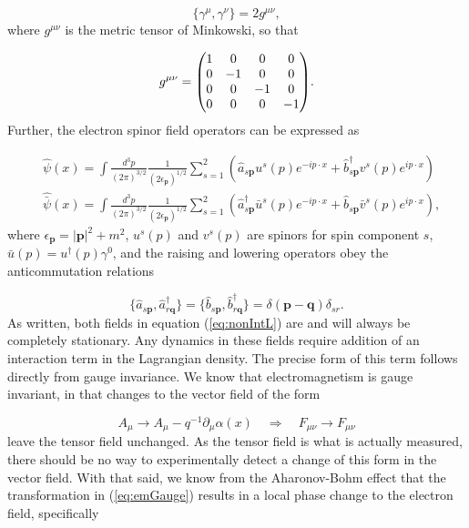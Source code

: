 \documentclass{article}
\begin{document}
\begin{equation}
    \{\gamma^\mu, \gamma^\nu\} = 2g^{\mu\nu},
\end{equation}
%
where $g^{\mu\nu}$ is the metric tensor of Minkowski, so that

\begin{equation}
    g^{\mu\nu} 
    =
    \mqty(
    1&0&0&0\\
    0&-1&0&0\\
    0&0&-1&0\\
    0&0&0&-1
    ).
\end{equation}
%
Further, the electron spinor field operators can be expressed as

\begin{equation}
\label{eq:electronField}
\begin{aligned}
    &\hat{\psi}(x)
    =
    \int\frac{d^3p}{(2\pi)^{3/2}}\frac{1}{(2\epsilon_\mathbf{p})^{1/2}}
    \sum_{s=1}^2
    \left(
    \hat{a}_{s\mathbf{p}}u^s(p)e^{-ip\cdot x}
    +
    \hat{b}^\dag_{s\mathbf{p}} v^s(p)e^{ip\cdot x}
    \right)
    \\&\hat{\bar{\psi}}(x)
    =
    \int\frac{d^3p}{(2\pi)^{3/2}}\frac{1}{(2\epsilon_\mathbf{p})^{1/2}}
    \sum_{s=1}^2
    \left(
    \hat{a}^\dag_{s\mathbf{p}} \bar{u}^s(p)e^{-ip\cdot x}
    +
    \hat{b}_{s\mathbf{p}} \bar{v}^s(p)e^{ip\cdot x}
\right),
\end{aligned}
\end{equation}
%
where $\epsilon_\mathbf{p} = |\mathbf{p}|^2 + m^2$, $u^s(p)$ and $v^s(p)$ are spinors for spin component $s$, $\bar{u}(p) = u^\dag(p)\gamma^0$, and the raising and lowering operators obey the anticommutation relations

\begin{equation}
    \{\hat{a}_{s\mathbf{p}}, \hat{a}^\dag_{r\mathbf{q}}\}
    =
    \{\hat{b}_{s\mathbf{p}}, \hat{b}^\dag_{r\mathbf{q}}\}
    =
    \delta(\mathbf{p} - \mathbf{q})\delta_{sr}.
\end{equation}
%
As written, both fields in equation (\ref{eq:nonIntL}) are and will always be completely stationary. Any dynamics in these fields require addition of an interaction term in the Lagrangian density.  The precise form of this term follows directly from gauge invariance.  We know that electromagnetism is gauge invariant, in that changes to the vector field of the form

\begin{equation}
\label{eq:emGauge}
    A_\mu \rightarrow A_\mu-q^{-1}\partial_\mu \alpha(x)
    \quad
    \Rightarrow
    \quad
    F_{\mu\nu} \rightarrow F_{\mu\nu}
\end{equation}
%
leave the tensor field unchanged.  As the tensor field is what is actually measured, there should be no way to experimentally detect a change of this form in the vector field.  With that said, we know from the Aharonov-Bohm effect \cite{Aharonov1959} that the transformation in (\ref{eq:emGauge}) results in a local phase change to the electron field, specifically
\end{document}
